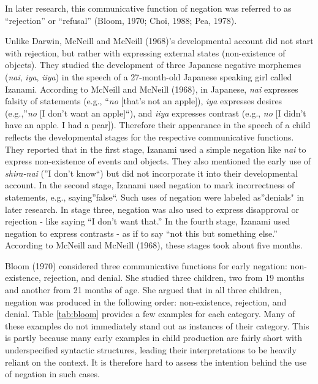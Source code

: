 \documentclass[
  english,
  man,floatsintext]{apa6}
\begin{document}
In later research, this communicative function of negation was referred to as ``rejection'' or ``refusal'' (Bloom, 1970; Choi, 1988; Pea, 1978).

Unlike Darwin, McNeill and McNeill (1968)'s developmental account did not start with rejection, but rather with expressing external states (non-existence of objects). They studied the development of three Japanese negative morphemes (\emph{nai}, \emph{iya}, \emph{iiya}) in the speech of a 27-month-old Japanese speaking girl called Izanami. According to McNeill and McNeill (1968), in Japanese, \emph{nai} expresses falsity of statements (e.g., ``\emph{no} {[}that's not an apple{]}), \emph{iya} expresses desires (e.g.,''\emph{no} {[}I don't want an apple{]}``), and \emph{iiya} expresses contrast (e.g., \emph{no} {[}I didn't have an apple. I had a pear{]}). Therefore their appearance in the speech of a child reflects the developmental stages for the respective communicative functions. They reported that in the first stage, Izanami used a simple negation like \emph{nai} to express non-existence of events and objects. They also mentioned the early use of \emph{shira-nai} (''I don't know``) but did not incorporate it into their developmental account. In the second stage, Izanami used negation to mark incorrectness of statements, e.g., saying''false``. Such uses of negation were labeled as''denials" in later research. In stage three, negation was also used to express disapproval or rejection - like saying ``I don't want that.'' In the fourth stage, Izanami used negation to express contrasts - as if to say ``not this but something else.'' According to McNeill and McNeill (1968), these stages took about five months.

Bloom (1970) considered three communicative functions for early negation: non-existence, rejection, and denial. She studied three children, two from 19 months and another from 21 months of age. She argued that in all three children, negation was produced in the following order: non-existence, rejection, and denial. Table \ref{tab:bloom} provides a few examples for each category. Many of these examples do not immediately stand out as instances of their category. This is partly because many early examples in child production are fairly short with underspecified syntactic structures, leading their interpretations to be heavily reliant on the context. It is therefore hard to assess the intention behind the use of negation in such cases.
\end{document}
